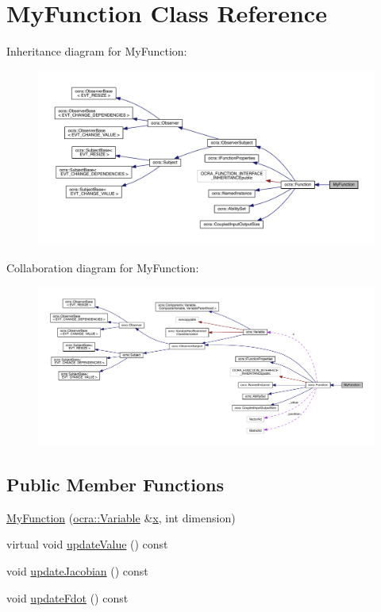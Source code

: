 \hypertarget{classMyFunction}{}\section{My\+Function Class Reference}
\label{classMyFunction}


Inheritance diagram for My\+Function\+:\nopagebreak
\begin{figure}[H]
\begin{center}
\leavevmode
\includegraphics[width=350pt]{d7/d61/classMyFunction__inherit__graph}
\end{center}
\end{figure}


Collaboration diagram for My\+Function\+:\nopagebreak
\begin{figure}[H]
\begin{center}
\leavevmode
\includegraphics[width=350pt]{da/de1/classMyFunction__coll__graph}
\end{center}
\end{figure}
\subsection*{Public Member Functions}
\begin{DoxyCompactItemize}
\item 
\hyperlink{classMyFunction_addcad41fa4e120bf9decb70b4b22f935}{My\+Function} (\hyperlink{classocra_1_1Variable}{ocra\+::\+Variable} \&\hyperlink{classocra_1_1Function_a28825886d1f149c87b112ec2ec1dd486}{x}, int dimension)
\item 
virtual void \hyperlink{classMyFunction_a53829722ebc3fce3d1fa9b96c61b2b53}{update\+Value} () const
\item 
void \hyperlink{classMyFunction_a5ff3f1717385a96fe60fb1b993db0ef3}{update\+Jacobian} () const
\item 
void \hyperlink{classMyFunction_af0219da97114570582c6a02cf072a7db}{update\+Fdot} () const
\end{DoxyCompactItemize}
